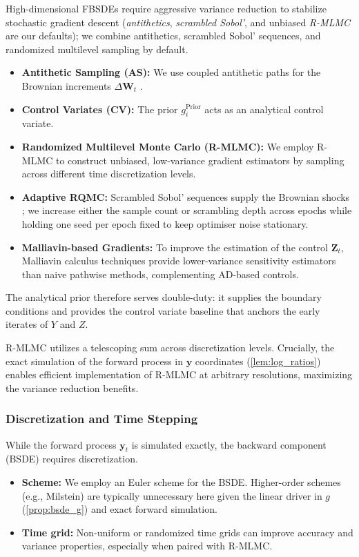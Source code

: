 \documentclass[11pt,letterpaper,oneside]{article}
\numberwithin{equation}{section}
\newcommand{\1}{\mathbf{1}}
\begin{document}
High-dimensional FBSDEs require aggressive variance reduction to stabilize stochastic gradient descent (\emph{antithetics}, \emph{scrambled Sobol'}, and unbiased \emph{R-MLMC} are our defaults); we combine antithetics, scrambled Sobol' sequences, and randomized multilevel sampling by default.
\begin{itemize}[leftmargin=1.25em]
   \item \textbf{Antithetic Sampling (AS):} We use coupled antithetic paths for the Brownian increments $\Delta\bm{W}_t$ \cite{glasserman2003}.
   \item \textbf{Control Variates (CV):} The prior $g_i^{\text{Prior}}$ acts as an analytical control variate.
  \item \textbf{Randomized Multilevel Monte Carlo (R-MLMC):} We employ R-MLMC \cite{rhee2015} to construct unbiased, low-variance gradient estimators by sampling across different time discretization levels.
  \item \textbf{Adaptive RQMC:} Scrambled Sobol' sequences supply the Brownian shocks \cite{owen1997scrambled,joe2008sobol}; we increase either the sample count or scrambling depth across epochs while holding one seed per epoch fixed to keep optimiser noise stationary.
  \item \textbf{Malliavin-based Gradients:} To improve the estimation of the control $\bm{Z}_t$, Malliavin calculus techniques \cite{fournie1999applications,kapllani2024,huang2025probabilistic} provide lower-variance sensitivity estimators than naive pathwise methods, complementing AD-based controls.
\end{itemize}
The analytical prior therefore serves double-duty: it supplies the boundary conditions and provides the control variate baseline that anchors the early iterates of $Y$ and $Z$.

\begin{tcolorbox}[didacticstyle,title={Implementation Insight: R-MLMC and Exact Simulation}]
R-MLMC utilizes a telescoping sum across discretization levels. Crucially, the exact simulation of the forward process in $\bm{y}$ coordinates (\cref{lem:log_ratios}) enables efficient implementation of R-MLMC at arbitrary resolutions, maximizing the variance reduction benefits.
\end{tcolorbox}

\subsubsection{Discretization and Time Stepping}
While the forward process $\bm{y}_t$ is simulated exactly, the backward component (BSDE) requires discretization.
\begin{itemize}[leftmargin=1.25em]
  \item \textbf{Scheme:} We employ an Euler scheme for the BSDE. Higher-order schemes (e.g., Milstein) are typically unnecessary here given the linear driver in $g$ (\cref{prop:bsde_g}) and exact forward simulation.
  \item \textbf{Time grid:} Non-uniform or randomized time grids can improve accuracy and variance properties, especially when paired with R-MLMC.
\end{itemize}
\end{document}

